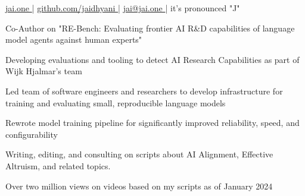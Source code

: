 \documentclass[]{resume}
\begin{document}
%
%
\lastupdated
\github

%
%
{ 
    \href{http://jai.one }{jai.one }|
    \href{http://github.com/jaidhyani}{ github.com/jaidhyani }|
    \href{mailto:jai@jai.one}{ jai@jai.one }|
    it's pronounced "J"
}

%
%



%
%


\hfill
\begin{minipage}[t]{1.0\textwidth}






\vspace{\topsep} %

\begin{tightemize}
    \item Co-Author on "RE-Bench: Evaluating frontier AI R\&D capabilities of language model agents against human experts"
    \item Developing evaluations and tooling to detect AI Research Capabilities as part of Wijk Hjalmar's team
\end{tightemize}

\descript{}
\begin{tightemize}
    \item Led team of software engineers and researchers to develop infrastructure for training and evaluating small, reproducible  language models
    \item Rewrote model training pipeline for significantly improved reliability, speed, and configurability
\end{tightemize}
\begin{tightemize}
    \item Writing, editing, and consulting on scripts about AI Alignment, Effective Altruism, and related topics.
    \columnbreak
    \item Over two million views on videos based on my scripts as of January 2024
\end{tightemize}



\end{minipage}
\end{document}
